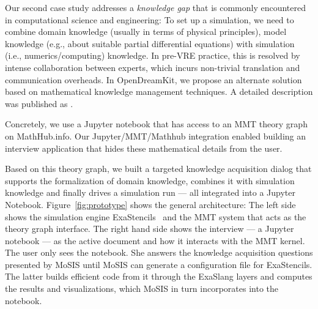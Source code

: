 Our second case study addresses a \emph{knowledge gap} that is commonly encountered in computational science and engineering:
To set up a simulation, we need to combine domain knowledge (usually in terms of physical principles), model knowledge (e.g., about suitable partial differential equations) with simulation (i.e., numerics/computing) knowledge.
In pre-VRE practice, this is resolved by intense collaboration between experts, which incurs non-trivial translation and communication overheads.
In OpenDreamKit, we propose an alternate solution based on mathematical knowledge management techniques.
A detailed description was published as \cite{PolKohKoe:kacse18}.

Concretely, we use a Jupyter notebook that has access to an MMT theory graph on MathHub.info.  Our Jupyter/MMT/Mathhub integration enabled building an interview application that hides these mathematical details from the user.



Based on this theory graph, we built a targeted knowledge acquisition dialog that supports the formalization of domain knowledge, combines it with simulation knowledge and finally drives a simulation run --- all integrated into a Jupyter Notebook.
Figure~\ref{fig:prototype} shows the general architecture:
The left side shows the simulation engine \textsf{ExaStencils}~\cite{exastencils.on} and the MMT system that acts as the theory graph interface.
The right hand side shows the interview --- a Jupyter notebook --- as the active document and how it interacts with the MMT kernel.
The user only sees the notebook.
She answers the knowledge acquisition questions presented by MoSIS until MoSIS can generate a configuration file for ExaStencils.
The latter builds efficient code from it through the ExaSlang layers and computes the results and visualizations, which MoSIS in turn incorporates into the notebook. 


